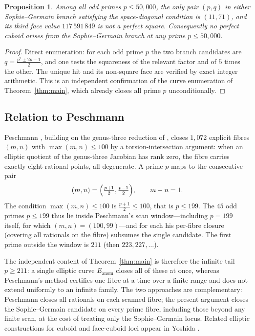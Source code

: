 \documentclass[11pt,reqno]{amsart}
\theoremstyle{plain}
\newtheorem{proposition}{Proposition}
\theoremstyle{definition}
\newcommand{\Eanom}{E_{\mathrm{anom}}}
\begin{document}
\begin{proposition}\label{prop:audit}
Among all odd primes $p\le 50{,}000$, the only pair $(p,q)$ in either Sophie--Germain
branch satisfying the space-diagonal condition is $(11,71)$, and its third face value
$117\,591\,849$ is not a perfect square. Consequently no perfect cuboid arises from the
Sophie--Germain branch at any prime $p\le 50{,}000$.
\end{proposition}

\begin{proof}
Direct enumeration: for each odd prime $p$ the two branch candidates are
$q=\tfrac{p^{2}\pm 2p-1}{2}$, and one tests the squareness of the relevant factor and of
$5$ times the other. The unique hit and its non-square face are verified by exact integer
arithmetic. This is an independent confirmation of the curve enumeration of
Theorem~\ref{thm:main}, which already closes all prime $p$ unconditionally.
\end{proof}

\subsection{Relation to Peschmann}
Peschmann \cite{Pes1}, building on the genus-three reduction of \cite{Pes2}, closes
$1{,}072$ explicit fibres $(m,n)$ with $\max(m,n)\le 100$ by a torsion-intersection
argument: when an elliptic quotient of the genus-three Jacobian has rank zero, the fibre
carries exactly eight rational points, all degenerate. A prime $p$ maps to
the consecutive pair
\[
(m,n)=\Bigl(\tfrac{p+1}{2},\tfrac{p-1}{2}\Bigr),\qquad m-n=1 .
\]
The condition $\max(m,n)\le 100$ is $\tfrac{p+1}{2}\le 100$, that is $p\le 199$. The
$45$ odd primes $p\le 199$ thus lie inside Peschmann's scan window---including $p=199$
itself, for which $(m,n)=(100,99)$---and for each his per-fibre closure (covering all
rationals on the fibre) subsumes the single candidate. The first prime outside the window
is $211$ (then $223,227,\ldots$).

The independent content of Theorem~\ref{thm:main} is therefore the infinite tail
$p\ge 211$: a single elliptic curve $\Eanom$ closes all of these at once, whereas
Peschmann's method certifies one fibre at a time over a finite range and does not extend
uniformly to an infinite family. The two approaches are complementary: Peschmann closes
all rationals on each scanned fibre; the present argument closes the Sophie--Germain
candidate on every prime fibre, including those beyond any finite scan, at the cost of
treating only the Sophie--Germain locus. Related elliptic constructions for cuboid and
face-cuboid loci appear in Yoshida \cite{Yoshida}.
\end{document}

